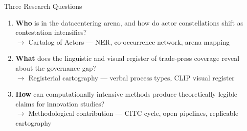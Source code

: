 \documentclass[aspectratio=169,11pt]{beamer}
\newcommand{\iconfull}[2]{\textcolor{#1}{\faIcon{#2}}}
\begin{document}
\begin{frame}{\iconfull{dcblue}{question-circle}\enspace Three Research Questions}
\vspace{0.5em}
\begin{enumerate}\setlength\itemsep{1.1em}
  \item[\textbf{RQ1}] \textbf{Who} is in the datacentering arena, and how do actor constellations shift as contestation intensifies?\\
    \textcolor{dcgray}{\footnotesize $\to$ Cartalog of Actors — NER, co-occurrence network, arena mapping}

  \item[\textbf{RQ2}] \textbf{What} does the linguistic and visual register of trade-press coverage reveal about the governance gap?\\
    \textcolor{dcgray}{\footnotesize $\to$ Registerial cartography — verbal process types, CLIP visual register}

  \item[\textbf{RQ3}] \textbf{How} can computationally intensive methods produce theoretically legible claims for innovation studies?\\
    \textcolor{dcgray}{\footnotesize $\to$ Methodological contribution — CITC cycle, open pipelines, replicable cartography}
\end{enumerate}
\end{frame}
\end{document}
